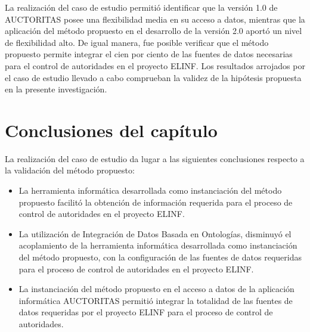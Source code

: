 La realización del caso de estudio permitió identificar que la versión 1.0 de AUCTORITAS posee una flexibilidad media en su acceso a datos, mientras que la aplicación del método propuesto en el desarrollo de la versión 2.0 aportó un nivel de flexibilidad alto. De igual manera, fue posible verificar que el método propuesto permite integrar el cien por ciento de las fuentes de datos necesarias para el control de autoridades en el proyecto ELINF. Los resultados arrojados por el caso de estudio llevado a cabo comprueban la validez de la hipótesis propuesta en la presente investigación.

\section{Conclusiones del capítulo}

La realización del caso de estudio da lugar a las siguientes conclusiones respecto a la validación del método propuesto:

\begin{itemize}
\item La herramienta informática desarrollada como instanciación del método propuesto facilitó la obtención de información requerida para el proceso de  control de autoridades en el proyecto ELINF.
\item La utilización de Integración de Datos Basada en Ontologías, disminuyó el acoplamiento de la herramienta informática desarrollada como instanciación del método propuesto, con la configuración de las fuentes de datos requeridas para el proceso de  control de autoridades en el proyecto ELINF.
\item La instanciación del método propuesto en el acceso a datos de la aplicación informática AUCTORITAS permitió integrar la totalidad de las fuentes de datos requeridas por el proyecto ELINF para el proceso de  control de autoridades.
\end{itemize}